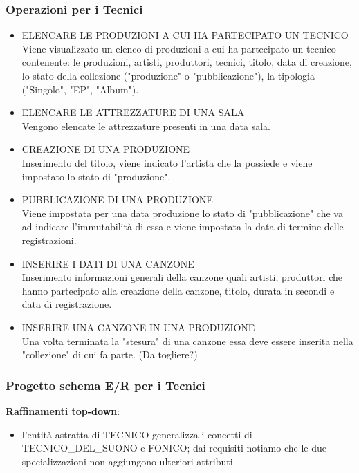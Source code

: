 \documentclass{article}
\newcounter{counteroperazioni}
\newcommand{\coperazioni}{\addtocounter{counteroperazioni}{1}\thecounteroperazioni}
\begin{document}
\subsubsection{Operazioni per i Tecnici}
\begin{itemize}[labelindent=1.5em,labelsep=.5cm,leftmargin=*]
    \item [\textbf{T\coperazioni)}] ELENCARE LE PRODUZIONI A CUI HA PARTECIPATO UN TECNICO \\ Viene visualizzato un elenco di produzioni a cui ha partecipato un tecnico contenente: le produzioni, artisti, produttori, tecnici, titolo, data di creazione, lo stato della collezione ("produzione" o "pubblicazione"), la tipologia ("Singolo", "EP", "Album").
    \item [\textbf{T\coperazioni)}] ELENCARE LE ATTREZZATURE DI UNA SALA \\ Vengono elencate le attrezzature presenti in una data sala.
    \item [\textbf{T\coperazioni)}] CREAZIONE DI UNA PRODUZIONE \\ Inserimento del titolo, viene indicato l'artista che la possiede e viene impostato lo stato di "produzione".
    \item [\textbf{T\coperazioni)}] PUBBLICAZIONE DI UNA PRODUZIONE \\ Viene impostata per una data produzione lo stato di "pubblicazione" che va ad indicare l'immutabilità di essa e viene impostata la data di termine delle registrazioni. 
    \item [\textbf{T\coperazioni)}] INSERIRE I DATI DI UNA CANZONE\\ Inserimento informazioni generali della canzone quali artisti, produttori che hanno partecipato alla creazione della canzone, titolo, durata in secondi e data di registrazione.
    \item [\textbf{T\coperazioni)}] INSERIRE UNA CANZONE IN UNA PRODUZIONE \\ Una volta terminata la "stesura" di una canzone essa deve essere inserita nella "collezione" di cui fa parte. (Da togliere?)
\end{itemize}

\subsubsection{Progetto schema E/R per i Tecnici}
\begin{center}
    
\end{center}
\textbf{Raffinamenti top-down}:
\begin{itemize}
    \item l'entità astratta di TECNICO generalizza i concetti di TECNICO\_DEL\_SUONO e FONICO; dai requisiti notiamo che le due specializzazioni non aggiungono ulteriori attributi. 
\end{itemize}
\end{document}

